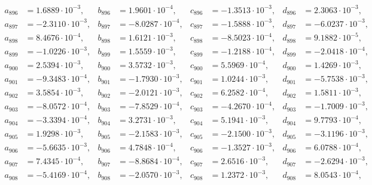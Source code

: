 \begin{align*}
  a_{ 896 } &= 1.6889 \cdot 10^{ -3 }, & b_{ 896 } &= 1.9601 \cdot 10^{ -4 }, & c_{ 896 } &= -1.3513 \cdot 10^{ -3 }, & d_{ 896 } &= 2.3063 \cdot 10^{ -3 }, \\ 
  a_{ 897 } &= -2.3110 \cdot 10^{ -3 }, & b_{ 897 } &= -8.0287 \cdot 10^{ -4 }, & c_{ 897 } &= -1.5888 \cdot 10^{ -3 }, & d_{ 897 } &= -6.0237 \cdot 10^{ -3 }, \\ 
  a_{ 898 } &= 8.4676 \cdot 10^{ -4 }, & b_{ 898 } &= 1.6121 \cdot 10^{ -3 }, & c_{ 898 } &= -8.5023 \cdot 10^{ -4 }, & d_{ 898 } &= 9.1882 \cdot 10^{ -5 }, \\ 
  a_{ 899 } &= -1.0226 \cdot 10^{ -3 }, & b_{ 899 } &= 1.5559 \cdot 10^{ -3 }, & c_{ 899 } &= -1.2188 \cdot 10^{ -4 }, & d_{ 899 } &= -2.0418 \cdot 10^{ -4 }, \\ 
  a_{ 900 } &= 2.5394 \cdot 10^{ -3 }, & b_{ 900 } &= 3.5732 \cdot 10^{ -3 }, & c_{ 900 } &= 5.5969 \cdot 10^{ -4 }, & d_{ 900 } &= 1.4269 \cdot 10^{ -3 }, \\ 
  a_{ 901 } &= -9.3483 \cdot 10^{ -4 }, & b_{ 901 } &= -1.7930 \cdot 10^{ -3 }, & c_{ 901 } &= 1.0244 \cdot 10^{ -3 }, & d_{ 901 } &= -5.7538 \cdot 10^{ -3 }, \\ 
  a_{ 902 } &= 3.5854 \cdot 10^{ -3 }, & b_{ 902 } &= -2.0121 \cdot 10^{ -3 }, & c_{ 902 } &= 6.2582 \cdot 10^{ -4 }, & d_{ 902 } &= 1.5811 \cdot 10^{ -3 }, \\ 
  a_{ 903 } &= -8.0572 \cdot 10^{ -4 }, & b_{ 903 } &= -7.8529 \cdot 10^{ -4 }, & c_{ 903 } &= -4.2670 \cdot 10^{ -4 }, & d_{ 903 } &= -1.7009 \cdot 10^{ -3 }, \\ 
  a_{ 904 } &= -3.3394 \cdot 10^{ -4 }, & b_{ 904 } &= 3.2731 \cdot 10^{ -3 }, & c_{ 904 } &= 5.1941 \cdot 10^{ -3 }, & d_{ 904 } &= 9.7793 \cdot 10^{ -4 }, \\ 
  a_{ 905 } &= 1.9298 \cdot 10^{ -3 }, & b_{ 905 } &= -2.1583 \cdot 10^{ -3 }, & c_{ 905 } &= -2.1500 \cdot 10^{ -3 }, & d_{ 905 } &= -3.1196 \cdot 10^{ -3 }, \\ 
  a_{ 906 } &= -5.6635 \cdot 10^{ -3 }, & b_{ 906 } &= 4.7848 \cdot 10^{ -4 }, & c_{ 906 } &= -1.3527 \cdot 10^{ -3 }, & d_{ 906 } &= 6.0788 \cdot 10^{ -4 }, \\ 
  a_{ 907 } &= 7.4345 \cdot 10^{ -4 }, & b_{ 907 } &= -8.8684 \cdot 10^{ -4 }, & c_{ 907 } &= 2.6516 \cdot 10^{ -3 }, & d_{ 907 } &= -2.6294 \cdot 10^{ -3 }, \\ 
  a_{ 908 } &= -5.4169 \cdot 10^{ -4 }, & b_{ 908 } &= -2.0570 \cdot 10^{ -3 }, & c_{ 908 } &= 1.2372 \cdot 10^{ -3 }, & d_{ 908 } &= 8.0543 \cdot 10^{ -4 }, \\ 

\end{align*}

